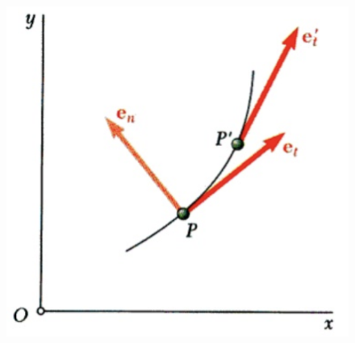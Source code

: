 \documentclass{article}
\begin{document}
\begin{figure}[h]
    \includegraphics[scale=0.7]{img2}
    \centering
\end{figure}
\end{document}
